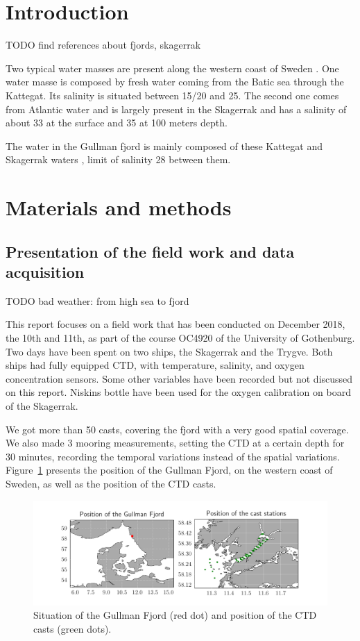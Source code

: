 \documentclass[12pt,a4paper]{article}
\begin{document}
\newpage

\section{\label{sec_intro}Introduction}

TODO find references about fjords, skagerrak


Two typical water masses are present along the western coast of Sweden
\citep{bjork2003,gustafsson1996}.
One water masse is composed by fresh water coming from the Batic sea through the Kattegat.
Its salinity is situated between 15/20 and 25.
The second one comes from Atlantic water and is largely present in the Skagerrak
and has a salinity of about 33 at the surface and 35 at 100 meters depth.

The water in the Gullman fjord is mainly composed of these
Kattegat and Skagerrak waters \citep{arneborg2003}, limit of
salinity 28 between them.

\section{Materials and methods}
\subsection{Presentation of the field work and data acquisition}

TODO bad weather: from high sea to fjord

This report focuses on a field work that has been conducted on December 2018, the
10th and 11th, as part of the course OC4920 of the University of Gothenburg.
Two days have been spent on two ships, the Skagerrak and the Trygve.
Both ships had fully equipped CTD, with temperature, salinity, and oxygen concentration
sensors. Some other variables have been recorded but not discussed on this
report. Niskins bottle have been used for the oxygen calibration on board of
the Skagerrak.

We got more than 50 casts, covering the fjord with a very good spatial coverage.
We also made 3 mooring measurements, setting the CTD at a certain depth
for 30 minutes, recording the temporal variations instead of the
spatial variations.
Figure~\ref{fig:stations} presents the position of the Gullman Fjord, on the western
coast of Sweden, as well as the position of the CTD casts.

\begin{figure}
  \centering
  \includegraphics{stations}
  \caption{\label{fig:stations}Situation of the Gullman Fjord (red dot) and position
    of the CTD casts (green dots).}
\end{figure}
\end{document}
